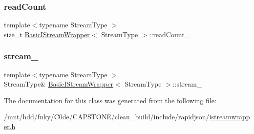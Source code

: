 \mbox{\label{classBasicIStreamWrapper_aa603c5540319d160fea25702620213ac}} 
\subsubsection{\texorpdfstring{read\+Count\+\_\+}{readCount\_}}
{\footnotesize\ttfamily template$<$typename Stream\+Type $>$ \\
size\+\_\+t \hyperlink{classBasicIStreamWrapper}{Basic\+I\+Stream\+Wrapper}$<$ Stream\+Type $>$\+::read\+Count\+\_\+\hspace{0.3cm}{\ttfamily [private]}}

\mbox{\label{classBasicIStreamWrapper_a08cb5cad6653f35761ef1cdcaa407aa9}} 
\subsubsection{\texorpdfstring{stream\+\_\+}{stream\_}}
{\footnotesize\ttfamily template$<$typename Stream\+Type $>$ \\
Stream\+Type\& \hyperlink{classBasicIStreamWrapper}{Basic\+I\+Stream\+Wrapper}$<$ Stream\+Type $>$\+::stream\+\_\+\hspace{0.3cm}{\ttfamily [private]}}



The documentation for this class was generated from the following file\+:\begin{DoxyCompactItemize}
\item 
/mnt/hdd/fnky/\+C0de/\+C\+A\+P\+S\+T\+O\+N\+E/clean\+\_\+build/include/rapidjson/\hyperlink{istreamwrapper_8h}{istreamwrapper.\+h}\end{DoxyCompactItemize}
